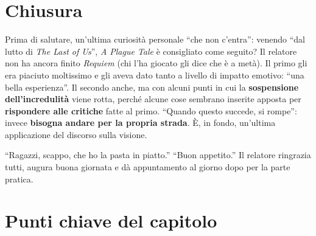 \section{Chiusura}
\label{sec:z6-chiusura}

Prima di salutare, un'ultima curiosità personale ``che non c'entra'': venendo
``dal lutto di \emph{The Last of Us}'', \emph{A Plague Tale} è consigliato come
seguito? Il relatore non ha ancora finito \emph{Requiem} (chi l'ha giocato gli
dice che è a metà). Il primo gli era piaciuto moltissimo e gli aveva dato tanto a
livello di impatto emotivo: ``una bella esperienza''. Il secondo anche, ma con
alcuni punti in cui la \textbf{sospensione dell'incredulità} viene rotta, perché
alcune cose sembrano inserite apposta per \textbf{rispondere alle critiche} fatte
al primo. ``Quando questo succede, si rompe'': invece \textbf{bisogna andare per la
propria strada}. È, in fondo, un'ultima applicazione del discorso sulla visione.

``Ragazzi, scappo, che ho la pasta in piatto.'' ``Buon appetito.'' Il relatore
ringrazia tutti, augura buona giornata e dà appuntamento al giorno dopo per la
parte pratica.

\section*{Punti chiave del capitolo}

